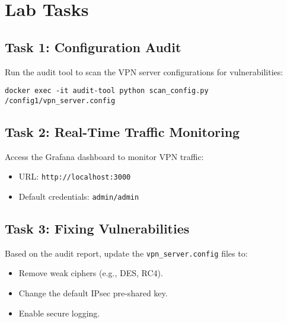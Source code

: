 \section{Lab Tasks}

\subsection{Task 1: Configuration Audit}
Run the audit tool to scan the VPN server configurations for vulnerabilities:
\begin{verbatim}
docker exec -it audit-tool python scan_config.py /config1/vpn_server.config
\end{verbatim}

\subsection{Task 2: Real-Time Traffic Monitoring}
Access the Grafana dashboard to monitor VPN traffic:
\begin{itemize}
    \item URL: \texttt{http://localhost:3000}
    \item Default credentials: \texttt{admin/admin}
\end{itemize}

\subsection{Task 3: Fixing Vulnerabilities}
Based on the audit report, update the \texttt{vpn\_server.config} files to:
\begin{itemize}
    \item Remove weak ciphers (e.g., DES, RC4).
    \item Change the default IPsec pre-shared key.
    \item Enable secure logging.
\end{itemize}
